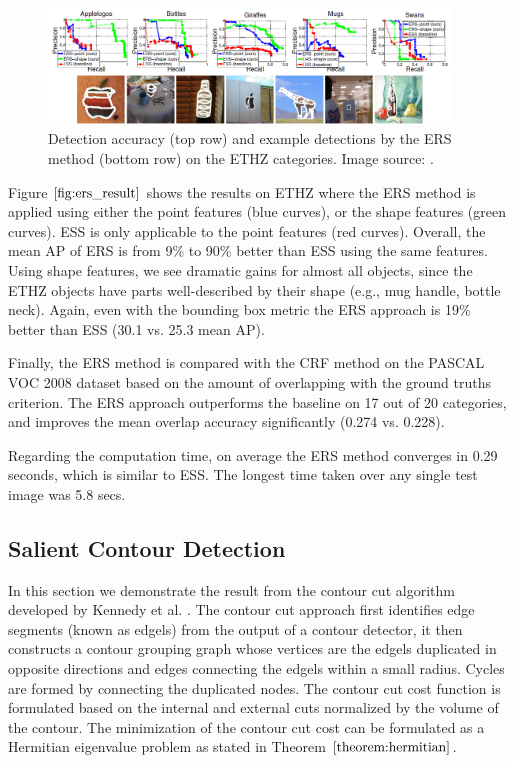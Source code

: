 \documentclass{SMBV12}
\begin{document}
\begin{figure}[htbp]
    \centering
    \includegraphics[width=0.95\textwidth]{images/ERS_result.png}
    \caption{Detection accuracy (top row) and example detections by the ERS method (bottom row) on the ETHZ categories. Image source: \cite{VijayGrauman2011}.}
    \label{fig:ers_result}
\end{figure}

Figure $\ref{fig:ers_result}$ shows the results on ETHZ where the ERS method is applied using either the point features (blue curves), or the shape features (green curves). ESS is only applicable to the point features (red curves). Overall, the mean AP of ERS is from 9\% to 90\% better than ESS using the same features. Using shape features, we see dramatic gains for almost all objects, since the ETHZ objects have parts well-described by their shape (e.g., mug handle, bottle neck). Again, even with the bounding box metric the ERS approach is 19\% better than ESS (30.1 vs. 25.3 mean AP).

Finally, the ERS method is compared with the CRF method on the PASCAL VOC 2008 dataset based on the amount of overlapping with the ground truths criterion. The ERS approach outperforms the baseline on 17 out of 20 categories, and improves the mean overlap accuracy significantly (0.274 vs. 0.228).

Regarding the computation time, on average the ERS method converges in 0.29 seconds, which is similar to ESS. The longest time taken over any single test image was 5.8 secs.

\subsection{Salient Contour Detection}

In this section we demonstrate the result from the contour cut algorithm developed by Kennedy et al. \cite{KenGalShi2011}. The contour cut approach first identifies edge segments (known as edgels) from the output of a contour detector, it then constructs a contour grouping graph whose vertices are the edgels duplicated in opposite directions and edges connecting the edgels within a small radius. Cycles are formed by connecting the duplicated nodes. The contour cut cost function is formulated based on the internal and external cuts normalized by the volume of the contour. The minimization of the contour cut cost can be formulated as a Hermitian eigenvalue problem as stated in Theorem $\ref{theorem:hermitian}$.
\end{document}
